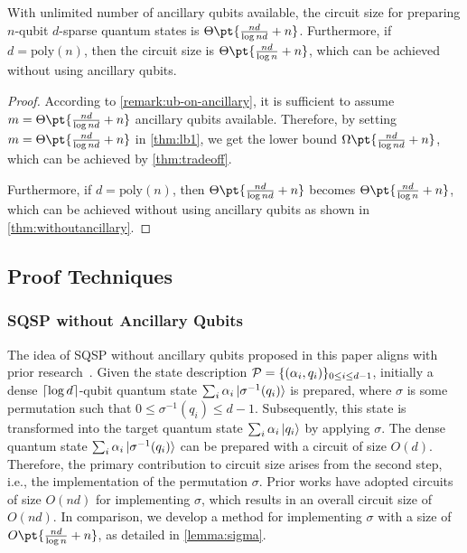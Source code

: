 \documentclass[a4paper,UKenglish,cleveref, autoref, thm-restate]{lipics-v2021}
\DeclarePairedDelimiter\cbra{\{}{\}}
\DeclarePairedDelimiter\ceil{\lceil}{\rceil}
\newcommand{\bo}{O\pt}
\newcommand{\om}{\Omega\pt}
\newcommand{\ta}{\Theta\pt}
\begin{document}
\begin{theorem}\label{thm: umlimited}
    {With unlimited  number of ancillary qubits available}, the circuit size for preparing $n$-qubit $d$-sparse quantum states is $\ta{\frac{nd}{\log nd} + n}$. Furthermore, if $d =\mathrm{poly}(n)$, then the circuit size is $\ta{\frac{nd}{\log n} + n}$, which can be achieved without using ancillary qubits.
\end{theorem}


\begin{proof}

According to \cref{remark:ub-on-ancillary}, it is sufficient to assume  $m = \ta{\frac{nd}{\log nd}+n}$ ancillary qubits available. Therefore, by setting $m = \ta{\frac{nd}{\log nd}+n}$ in \cref {thm:lb1}, we get the lower bound   $\om{\frac{nd}{\log nd} + n}$, which can be achieved by \cref{thm:tradeoff}.

Furthermore,  if $d = \mathrm{poly} (n)$, then  $\ta{\frac{nd}{\log nd} + n}$ becomes $\ta{\frac{nd}{\log n} + n}$, which can be achieved without using ancillary qubits as shown in  \cref{thm:withoutancillary}.
\end{proof}

\subsection{Proof Techniques}

\subsubsection{SQSP  without Ancillary Qubits}

The idea of  SQSP  without ancillary qubits proposed in this paper aligns with prior research~\cite{malvetti2021quantum, ramacciotti2023simple}. Given the state description  $\mathcal{P} = \cbra{(\alpha_i, q_i)}_{0\leq i \leq d-1}$, initially a dense $\ceil{\log d}$-qubit quantum state $\sum_i \alpha_i \ket{\sigma^{-1}(q_i)}$ is prepared, where $\sigma$ is some permutation such that $0 \leq \sigma^{-1}(q_i) \leq d - 1$. Subsequently, this state is transformed into the target quantum state $\sum_i \alpha_i \ket{q_i}$ by applying $\sigma$. The dense quantum state  $\sum_i \alpha_i \ket{\sigma^{-1}(q_i)}$ can be prepared with a circuit of size $O(d)$. Therefore, the primary contribution to circuit size arises from the second step, i.e., the implementation of the permutation $\sigma$. Prior works \cite{malvetti2021quantum, ramacciotti2023simple} have adopted circuits of size $O(nd)$ for implementing $\sigma$, which results in an overall circuit size of $O(nd)$. In comparison, we develop a method for implementing $\sigma$ with a size of $\bo{\frac{nd}{\log n}+n}$, as detailed in \cref{lemma:sigma}. 
\end{document}
